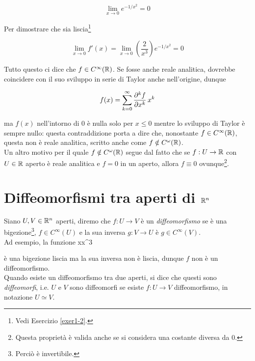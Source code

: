 \begin{equation}
	\lim_{x \to 0} e^{-1/x^{2}} = 0
\end{equation}

Per dimostrare che sia liscia\footnote{%
	Vedi Esercizio \ref{exer1-2}.}

\begin{equation}
	\lim_{x \to 0} f' (x) = \lim_{x \to 0} \left(\dfrac{2}{x^{3}}\right) e^{-1/x^{2}} = 0
\end{equation}

Tutto questo ci dice che $ f \in C^{\infty}(\mathbb{R}) $. Se fosse anche reale analitica, dovrebbe coincidere con il suo sviluppo in serie di Taylor anche nell'origine, dunque

\begin{align}
	\begin{split}
		f(x) = \sum_{k=0}^{\infty} \pdv[k]{f}{x} (0) \, x^{k}
	\end{split}
\end{align}

ma $ f(x) $ nell'intorno di 0 è nulla solo per $ x \leqslant 0 $ mentre lo sviluppo di Taylor è sempre nullo: questa contraddizione porta a dire che, nonostante $ f \in C^{\infty}(\mathbb{R}) $, questa non è reale analitica, scritto anche come $ f \notin C^{\omega}(\mathbb{R}) $. \\
Un altro motivo per il quale $ f \notin C^{\omega}(\mathbb{R}) $ segue dal fatto che se $ f : U \to \mathbb{R} $ con $ U \in \mathbb{R} $ aperto è reale analitica e $ f = 0 $ in un aperto, allora $ f \equiv 0 $ ovunque\footnote{%
	Questa proprietà è valida anche se si considera una costante diversa da 0.%
}.

\section{Diffeomorfismi tra aperti di $ \mathbb{R}^{n} $}

Siano $ U, V \in \mathbb{R}^{n} $ aperti, diremo che $ f : U \to V $ è un \textit{diffeomorfismo} se è una bigezione\footnote{%
	Perciò è invertibile.%
}, $ f \in C^{\infty}(U) $ e la sua inversa $ g : V \to U $ è  $ g \in C^{\infty}(V) $. \\
Ad esempio, la funzione
%
	{\R}{\R}
	{x}{x^{3}}

è una bigezione liscia ma la sua inversa non è liscia, dunque $ f $ non è un diffeomorfismo. \\
Quando esiste un diffeomorfismo tra due aperti, si dice che questi sono \textit{diffeomorfi}, i.e. $ U $ e $ V $ sono diffeomorfi se esiste $ f : U \to V $ diffeomorfismo, in notazione $ U \simeq V $. \\

